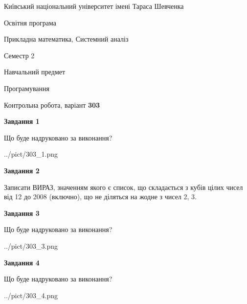 \documentclass[12pt, ukrainian]{article}
\begin{document}
{{\begin {small}\par
{ \center  Київський національний університет імені Тараса Шевченка \par}
{\parbox {5 cm}{Освітня програма \hfill}{\parbox {8 cm}{Прикладна математика, Системний аналіз \hfill}}\parbox {5 cm}{\hfill Семестр 2}}\par
{\parbox {5 cm} {Навчальний предмет \hfill}\parbox {7 cm}{Програмування \hfill}\parbox {6cm}{\hfill}\par}\vspace{-7pt} \end{small}}{\center Контрольна робота, варіант  \No \textbf
{ 303 }\par}}
{
\begin {large}
{\begin {center}\textbf{Завдання 1}\end {center}}\par
Що буде надруковано за виконання?\par\par
\begin{center}
	{../pict/303_1.png}
\end{center}
\newpage

{\begin {center}\textbf{Завдання 2}\end {center}}\par

Записати ВИРАЗ, значенням якого є список, що складається з кубів цілих чисел від 12 до 2008 (включно), що не діляться на жодне з чисел 2, 3.\par
\newpage

{\begin {center}\textbf{Завдання 3}\end {center}}\par
Що буде надруковано за виконання?\par
\begin{center}
	{../pict/303_3.png}
\end{center}
\newpage

{\begin {center}\textbf{Завдання 4}\end {center}}\par
Що буде надруковано за виконання?\par
\begin{center}
	{../pict/303_4.png}
\end{center}
\newpage


\end{large}}
\end{document}
